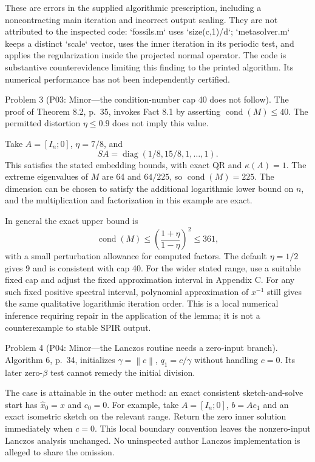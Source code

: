 \documentclass[10pt]{article}
\begin{document}
These are errors in the supplied algorithmic prescription, including a noncontracting main iteration and incorrect output scaling. They are not attributed to the inspected code: `fossils.m` uses `size(c,1)/d`; `metasolver.m` keeps a distinct `scale` vector, uses the inner iteration in its periodic test, and applies the regularization inside the projected normal operator. The code is substantive counterevidence limiting this finding to the printed algorithm. Its numerical performance has not been independently certified.\par
Problem 3 (P03: Minor—the condition-number cap 40 does not follow).  The proof of Theorem 8.2, p. 35, invokes Fact 8.1 by asserting \(\operatorname{cond}(M)\le40\). The permitted distortion \(\eta\le0.9\) does not imply this value.\par
Take \(A=[I_n;0]\), \(\eta=7/8\), and \[SA=\operatorname{diag}(1/8,15/8,1,\ldots,1).\] This satisfies the stated embedding bounds, with exact QR and \(\kappa(A)=1\). The extreme eigenvalues of \(M\) are 64 and \(64/225\), so \(\operatorname{cond}(M)=225\). The dimension can be chosen to satisfy the additional logarithmic lower bound on \(n\), and the multiplication and factorization in this example are exact.\par
In general the exact upper bound is \[\operatorname{cond}(M)\le
       \left(\frac{1+\eta}{1-\eta}\right)^2\le361,\] with a small perturbation allowance for computed factors. The default \(\eta=1/2\) gives 9 and is consistent with cap 40. For the wider stated range, use a suitable fixed cap and adjust the fixed approximation interval in Appendix C. For any such fixed positive spectral interval, polynomial approximation of \(x^{-1}\) still gives the same qualitative logarithmic iteration order. This is a local numerical inference requiring repair in the application of the lemma; it is not a counterexample to stable SPIR output.\par
Problem 4 (P04: Minor—the Lanczos routine needs a zero-input branch).  Algorithm 6, p. 34, initializes \(\gamma=\left\lVert c\right\rVert\), \(q_1=c/\gamma\) without handling \(c=0\). Its later zero-\(\beta\) test cannot remedy the initial division.\par
The case is attainable in the outer method: an exact consistent sketch-and-solve start has \(\widehat x_0=x\) and \(c_0=0\). For example, take \(A=[I_n;0]\), \(b=Ae_1\) and an exact isometric sketch on the relevant range. Return the zero inner solution immediately when \(c=0\). This local boundary convention leaves the nonzero-input Lanczos analysis unchanged. No uninspected author Lanczos implementation is alleged to share the omission.\par
\end{document}
